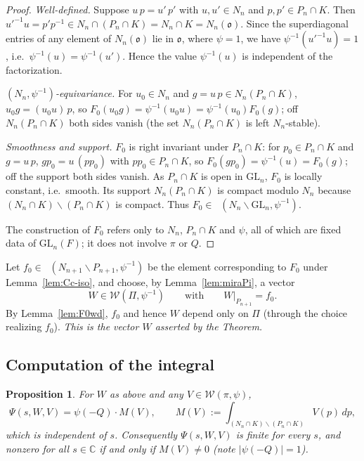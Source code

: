 \documentclass[12pt]{article}
\newcommand{\GL}{\mathrm{GL}}
\newcommand{\oo}{\mathfrak{o}}
\newcommand{\Wmod}{\mathcal{W}}
\DeclareMathOperator{\Cc}{C_c^\infty}
\newtheorem{proposition}{Proposition}
\begin{document}
\begin{proof}
\emph{Well-defined.} Suppose $u\,p=u'\,p'$ with $u,u'\in N_n$ and $p,p'\in P_n\cap K$.
Then $u'^{-1}u=p'p^{-1}\in N_n\cap(P_n\cap K)=N_n\cap K=N_n(\oo)$. Since the
superdiagonal entries of any element of $N_n(\oo)$ lie in $\oo$, where $\psi=1$, we
have $\psi^{-1}(u'^{-1}u)=1$, i.e.\ $\psi^{-1}(u)=\psi^{-1}(u')$. Hence the value
$\psi^{-1}(u)$ is independent of the factorization.

\emph{$(N_n,\psi^{-1})$-equivariance.} For $u_0\in N_n$ and $g=u\,p\in
N_n(P_n\cap K)$, $u_0g=(u_0u)\,p$, so $F_0(u_0g)=\psi^{-1}(u_0u)=\psi^{-1}(u_0)F_0(g)$;
off $N_n(P_n\cap K)$ both sides vanish (the set $N_n(P_n\cap K)$ is left
$N_n$-stable).

\emph{Smoothness and support.} $F_0$ is right invariant under $P_n\cap K$: for
$p_0\in P_n\cap K$ and $g=u\,p$, $g p_0=u\,(p p_0)$ with $p p_0\in P_n\cap K$, so
$F_0(gp_0)=\psi^{-1}(u)=F_0(g)$; off the support both sides vanish. As $P_n\cap K$
is open in $\GL_n$, $F_0$ is locally constant, i.e.\ smooth. Its support
$N_n(P_n\cap K)$ is compact modulo $N_n$ because $(N_n\cap K)\backslash(P_n\cap K)$
is compact. Thus $F_0\in\Cc(N_n\backslash\GL_n,\psi^{-1})$.

The construction of $F_0$ refers only to $N_n$, $P_n\cap K$ and $\psi$, all of which
are fixed data of $\GL_n(F)$; it does not involve $\pi$ or $Q$.
\end{proof}

Let $f_0\in\Cc(N_{n+1}\backslash P_{n+1},\psi^{-1})$ be the element corresponding to
$F_0$ under Lemma~\ref{lem:Cc-iso}, and choose, by Lemma~\ref{lem:miraPi}, a vector
\[
  W\in\Wmod(\Pi,\psi^{-1})\qquad\text{with}\qquad W|_{P_{n+1}}=f_0 .
\]
By Lemma~\ref{lem:F0wd}, $f_0$ and hence $W$ depend only on $\Pi$ (through the choice
realizing $f_0$). \emph{This is the vector $W$ asserted by the Theorem.}

\subsection{Computation of the integral}

\begin{proposition}\label{prop:collapse}
For $W$ as above and any $V\in\Wmod(\pi,\psi)$,
\begin{equation}\label{eq:collapse}
  \Psi(s,W,V)=\psi(-Q)\cdot M(V),\qquad
  M(V):=\int_{(N_n\cap K)\backslash(P_n\cap K)}V(p)\,dp ,
\end{equation}
which is independent of $s$. Consequently $\Psi(s,W,V)$ is finite for every $s$, and
nonzero for all $s\in\mathbb C$ if and only if $M(V)\neq0$ (note $|\psi(-Q)|=1$).
\end{proposition}
\end{document}
